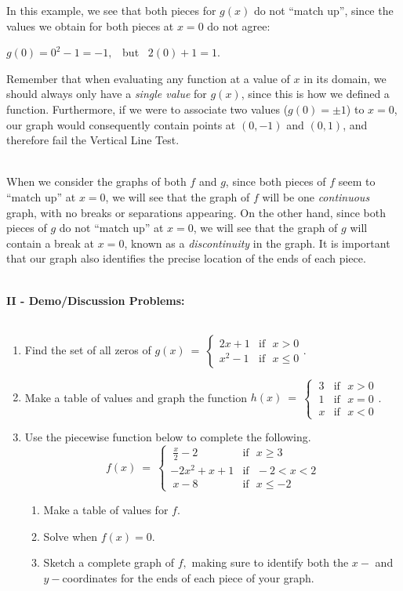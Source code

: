 \documentclass[12pt]{article}
\theoremstyle{definition}
\begin{document}
In this example, we see that both pieces for $g(x)$ do not ``match up'', since the values we obtain for both pieces at $x=0$ do not agree:
\begin{center}
$g(0)=0^2-1=-1,$ \ but \ $2(0)+1=1.$
\end{center}
Remember that when evaluating any function at a value of $x$ in its domain, we should always only have a {\it single value} for $g(x)$, since this is how we defined a function.  Furthermore, if we were to associate two values ($g(0)=\pm 1$) to $x=0$, our graph would consequently contain points at $(0,-1)$ and $(0,1)$, and therefore fail the Vertical Line Test.\\
\ \par
When we consider the graphs of both $f$ and $g$, since both pieces of $f$ seem to ``match up'' at $x=0$, we will see that the graph of $f$ will be one \textit{continuous} graph, with no breaks or separations appearing.  On the other hand, since both pieces of $g$ do not ``match up'' at $x=0$, we will see that the graph of $g$ will contain a break at $x=0$, known as a \textit{discontinuity} in the graph.  It is important that our graph also identifies the precise location of the ends of each piece.\\
\ \par
{\bf II - Demo/Discussion Problems:}\\
\ \par
\begin{enumerate}
\item Find the set of all zeros of $g(x)~=~
\begin{cases} 
      2x+1 & \text{if~~} x> 0\\
			x^2-1 & \text{if~~} x\leq 0
  \end{cases}
$.
\item Make a table of values and graph the function $h(x)~=~
	\begin{cases} 
      ~3 & \text{if~~} x> 0\\
			~1 & \text{if~~} x=0\\
			~x & \text{if~~} x<0
  \end{cases}
$.
\newpage
\item Use the piecewise function below to complete the following.
\[ f(x)~=~
	\begin{cases} 
      ~\frac{x}{2}-2 & \text{if~~} x\geq 3\\
			-2x^2+x+1 & \text{if~~} -2<x<2\\
			~x-8 & \text{if~~} x\leq -2
  \end{cases}
\]
\begin{enumerate}
	\item Make a table of values for $f$.
	\item Solve when $f(x)=0$.
	\item Sketch a complete graph of $f,$ making sure to identify both the $x-$ and $y-$coordinates for the ends of each piece of your graph.
\end{enumerate}
\end{enumerate}
\end{document}
